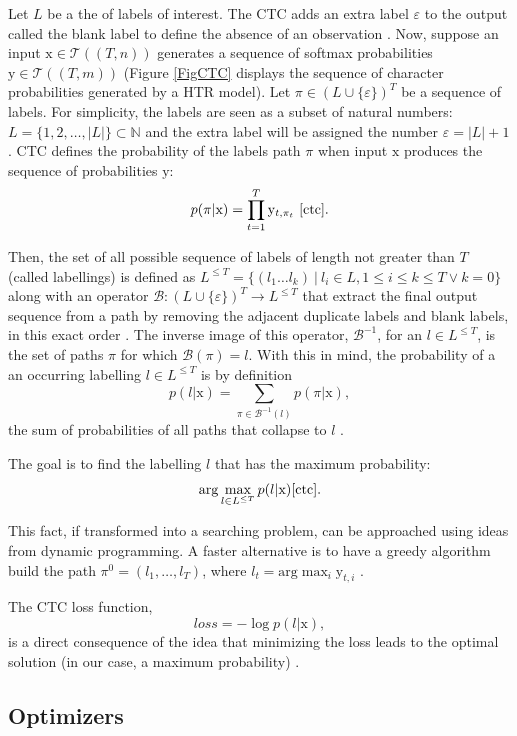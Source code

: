 Let $L$ be a the of labels of interest. The CTC adds an extra label $\varepsilon$ to the output called the blank label to define the absence of an observation \cite{ctc}. Now, suppose an input $\mathrm{x} \in \mathcal{T}((T, n))$ generates a sequence of softmax probabilities $\mathrm{y} \in \mathcal{T}((T, m))$ (Figure \ref{FigCTC} displays the sequence of character probabilities generated by a HTR model). Let $\pi\in(L\cup\{\varepsilon\})^T$ be a sequence of labels. For simplicity, the labels are seen as a subset of natural numbers: $L=\{1,2,\ldots,|L|\}\subset \mathbb{N}$ and the extra label will be assigned the number $\varepsilon=|L|+1$. CTC defines the probability of the labels path $\pi$ when input $\mathrm{x}$ produces the sequence of probabilities $\mathrm{y}$:
$$ p(\pi|\mathrm{x}) = \prod_{t=1}^T \mathrm{y}_{t, \pi_t} \ \cite{ctc}. $$

Then, the set of all possible sequence of labels of length not greater than $T$ (called labellings) is defined as $L^{\leq T} = \{ (l_1\ldots l_k)\ | \ l_i\in L, 1\leq i\leq k\leq T \lor k=0 \}$ along with an operator $\mathcal{B}:(L\cup\{\varepsilon\})^T\rightarrow L^{\leq T}$ that extract the final output sequence from a path by removing the adjacent duplicate labels and blank labels, in this exact order \cite{ctc}. The inverse image of this operator, 
$\mathcal{B}^{-1}$, for an $l\in L^{\le T}$, is the set of paths $\pi$ for which $\mathcal{B}(\pi)=l$. With this in mind, the probability of a an occurring labelling $l\in L^{\leq T}$ is by definition
$$ p(l|\mathrm{x}) = \sum_{\pi\in\mathcal{B}^{-1}(l)} p(\pi|\mathrm{x}), $$
the sum of probabilities of all paths that collapse to $l$ \cite{ctc}.

The goal is to find the labelling $l$ that has the maximum probability: 
$$\mathrm{arg} \max_{l\in L^{\leq T}} p(l|\mathrm{x}) \cite{ctc}.$$ 

This fact, if transformed into a searching problem, can be approached using ideas from dynamic programming. A faster alternative is to have a greedy algorithm build the path $\pi^0=(l_1,\ldots,l_T)$, where $l_t=\mathrm{arg} \max_{i} \mathrm{y}_{t,i}$ \cite{ctc}.

The CTC loss function, 
$$ loss = -\log p(l|\mathrm{x}), $$
is a direct consequence of the idea that minimizing the loss 
leads to the optimal solution (in our case, a maximum probability) \cite{ctc_peaky}.

\subsection{Optimizers}
\label{subsec:ch3sec3subsec6}

